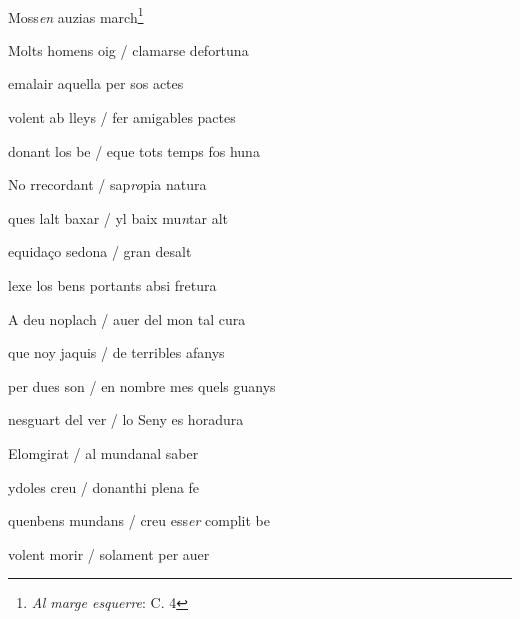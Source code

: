 \documentclass[12pt]{article}
\renewcommand{\espaiAbansEtiquetaPoema}{\vspace{0ex}}
\begin{document}
\begin{estrofa}

\espaiAbansEtiquetaPoema

\\

\begin{rubrica}

\pagina{[138v]} Moss\textit{en} auzias march\footnote{\textit{Al marge
esquerre}: C. 4}

\end{rubrica}

\end{estrofa}


\begin{estrofa}

 Molts homens oig / clamarse defortuna

 emalair aquella per sos actes

 volent ab lleys / fer amigables pactes

 donant los be / eque tots temps fos huna

 No rrecordant / sap\textit{ro}pia natura

 ques lalt baxar / yl baix mu\textit{n}tar alt

 equida\c{c}o sedona / gran desalt

 lexe los bens portants absi fretura

\end{estrofa}



\begin{estrofa}

 A deu noplach / auer del mon tal cura

 que noy jaquis / de terribles afanys

 per dues son / en nombre mes quels guanys

 nesguart del ver / lo Seny es horadura

 Elomgirat / al mundanal saber

 ydoles creu / donanthi plena fe

 quenbens mundans / creu ess\textit{er} complit be

 volent morir / solament per auer

\end{estrofa}
\end{document}
